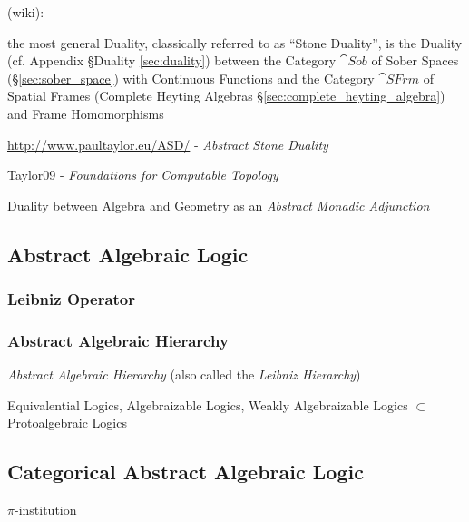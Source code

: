 (wiki):

the most general Duality, classically referred to as ``Stone Duality'', is the
Duality (cf. Appendix \S Duality \ref{sec:duality}) between the Category
$\cat{Sob}$ of Sober Spaces (\S\ref{sec:sober_space}) with Continuous Functions
and the Category $\cat{SFrm}$ of Spatial Frames (Complete Heyting Algebras
\S\ref{sec:complete_heyting_algebra}) and Frame Homomorphisms

\url{http://www.paultaylor.eu/ASD/} - \emph{Abstract Stone Duality}

Taylor09 - \emph{Foundations for Computable Topology}

Duality between Algebra and Geometry as an \emph{Abstract Monadic Adjunction}



\subsection{Abstract Algebraic Logic}
\label{sec:abstract_algebraic_logic}

\subsubsection{Leibniz Operator}\label{sec:leibniz_operator}



\subsubsection{Abstract Algebraic Hierarchy}\label{sec:leibniz_hierarchy}

\emph{Abstract Algebraic Hierarchy} (also called the \emph{Leibniz
  Hierarchy})

Equivalential Logics, Algebraizable Logics, Weakly Algebraizable
Logics $\subset$ Protoalgebraic Logics



\subsection{Categorical Abstract Algebraic Logic}
\label{sec:categorical_abstract}

$\pi$-institution
